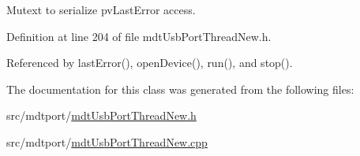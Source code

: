Mutext to serialize pv\-Last\-Error access. 



Definition at line 204 of file mdt\-Usb\-Port\-Thread\-New.\-h.



Referenced by last\-Error(), open\-Device(), run(), and stop().



The documentation for this class was generated from the following files\-:\begin{DoxyCompactItemize}
\item 
src/mdtport/\hyperlink{mdt_usb_port_thread_new_8h}{mdt\-Usb\-Port\-Thread\-New.\-h}\item 
src/mdtport/\hyperlink{mdt_usb_port_thread_new_8cpp}{mdt\-Usb\-Port\-Thread\-New.\-cpp}\end{DoxyCompactItemize}
